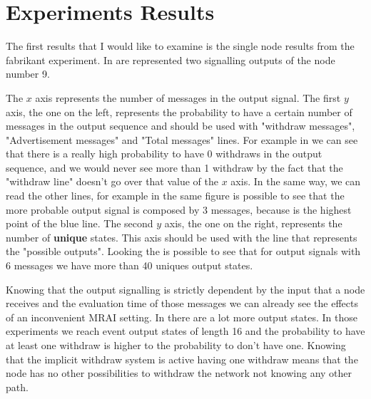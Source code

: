 \documentclass[10pt,conference,letterpaper]{IEEEtran}
\begin{document}
\section{Experiments Results}
\label{sec:results}

The first results that I would like to examine is the single node
results from the fabrikant experiment.
In  are represented
two signalling outputs of the node number \num{9}.

The $x$ axis represents the number of messages in the output signal.
The first $y$ axis, the one on the left, represents the probability to have a certain
number of messages in the output sequence and should be used with "withdraw
messages", "Advertisement messages" and "Total messages" lines.
For example in  we can see that there is a really
high probability to have \num{0} withdraws in the output sequence, and we would never
see more than 1 withdraw by the fact that the "withdraw line" doesn't go over that
value of the $x$ axis.
In the same way, we can read the other lines, for example in the same figure is
possible to see that the more probable output signal is composed by \num{3} messages,
because is the highest point of the blue line.
The second $y$ axis, the one on the right, represents the number of \textbf{unique}
states.
This axis should be used with the line that represents the "possible outputs".
Looking the  is possible to see that for
output signals with \num{6} messages we have more than \num{40} uniques output
states.

Knowing that the output signalling is strictly dependent by the input that a 
node receives and the evaluation time of those messages we can already see the
effects of an inconvenient \ac{MRAI} setting.
In  there are a lot more output states.
In those experiments we reach event output states of length \num{16} and the 
probability to have at least one withdraw is higher to the probability to 
don't have one.
Knowing that the implicit withdraw system is active having one withdraw means
that the node has no other possibilities to withdraw the network not knowing any
other path.
\end{document}
